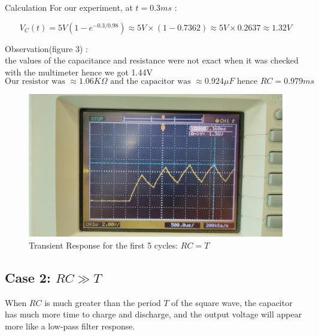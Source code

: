 \documentclass[a4paper,12pt]{article}
\begin{document}
Calculation For our experiment, at \( t = 0.3ms \) :

\[
V_C\left(t\right) = 5V \left( 1 - e^{-0.3/0.98} \right) \approx 5V \times (1 - 0.7362) \approx 5V \times 0.2637 \approx 1.32V
\]

Observation(figure 3) :\\the values of the capacitance and resistance were not exact when it was checked with the multimeter hence we got 1.44V\\
\[
\text{Our resistor was } \approx 1.06K\Omega \text{ and the capacitor was } \approx 0.924\mu F \text{ hence } RC = 0.979ms
\]

\begin{figure}[H]
    \centering
    \includegraphics[width=\textwidth]{figs/rc=t_tr.jpeg}
    \caption{Transient Response for the first 5 cycles: \( RC = T \) }
\end{figure}

\subsection*{Case 2: \( RC \gg T \)}
When \( RC \) is much greater than the period \( T \) of the square wave, the capacitor has much more time to charge and discharge, and the output voltage will appear more like a low-pass filter response.
\end{document}
